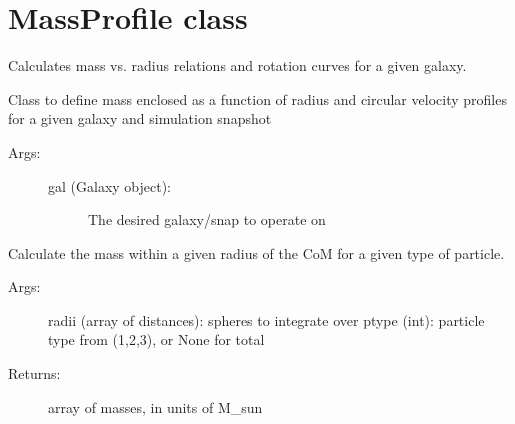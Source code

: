 \documentclass[letterpaper,10pt,english]{sphinxmanual}
\begin{document}
\label{\detokenize{massprofile:module-galaxy.massprofile}}

\chapter{MassProfile class}
\label{\detokenize{massprofile:massprofile-class}}\label{\detokenize{massprofile::doc}}
Calculates mass vs. radius relations and rotation curves for a given galaxy.

\begin{fulllineitems}
\label{\detokenize{massprofile:galaxy.massprofile.MassProfile}}
Class to define mass enclosed as a function of radius and circular velocity
profiles for a given galaxy and simulation snapshot
\begin{description}
\item[{Args:}] \leavevmode\begin{description}
\item[{gal (Galaxy object):}] \leavevmode
The desired galaxy/snap to operate on

\end{description}

\end{description}

\begin{fulllineitems}
\label{\detokenize{massprofile:galaxy.massprofile.MassProfile.mass_enclosed}}
Calculate the mass within a given radius of the CoM 
for a given type of particle.
\begin{description}
\item[{Args:}] \leavevmode
radii (array of distances): spheres to integrate over
ptype (int): particle type from (1,2,3), or None for total

\item[{Returns:}] \leavevmode
array of masses, in units of M\_sun


\end{description}
\end{fulllineitems}
\end{fulllineitems}
\end{document}
